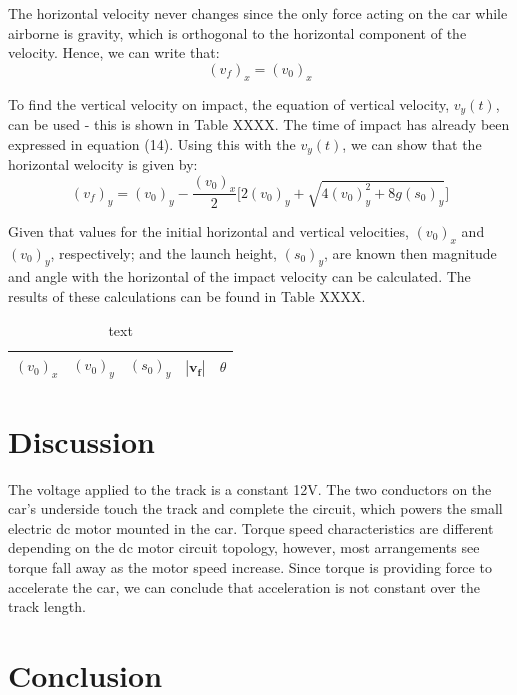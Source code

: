 \documentclass[a4paper]{article}
\begin{document}
The horizontal velocity never changes since the only force acting on the car while airborne is gravity, which is orthogonal to the horizontal component of the velocity. Hence, we can write that:
\begin{equation}
(v_f)_x = (v_0)_x
\end{equation}

To find the vertical velocity on impact, the equation of vertical velocity, $v_y(t)$, can be used - this is shown in Table XXXX. The time of impact has already been expressed in equation (14). Using this with the $v_y(t)$, we can show that the horizontal welocity is given by:
\begin{equation}
(v_f)_y = (v_0)_y - \frac{(v_0)_x}{2} \bigg[2(v_0)_y + \sqrt{4(v_0)_y^2 + 8g(s_0)_y}\bigg]
\end{equation}

Given that values for the initial horizontal and vertical velocities, $(v_0)_x$ and $(v_0)_y$, respectively; and the launch height, $(s_0)_y$, are known then magnitude and angle with the horizontal of the impact velocity can be calculated. The results of these calculations can be found in Table XXXX.

\begin{table}[h]
	\centering
	\caption{text}
	\begin{tabular}{rrrrr}
		\toprule
		$(v_0)_x$ & $(v_0)_y$ & $(s_0)_y$ & $|\boldsymbol{v_f}|$ & $\theta$\\
		\midrule
		\bottomrule
	\end{tabular}
\end{table}

\section{Discussion}
The voltage applied to the track is a constant 12$\si{\volt}$. The two conductors on the car's underside touch the track and complete the circuit, which powers the small electric dc motor mounted in the car. Torque speed characteristics are different depending on the dc motor circuit topology, however, most arrangements see torque fall away as the motor speed increase. Since torque is providing force to accelerate the car, we can conclude that acceleration is not constant over the track length.

\section{Conclusion}



\end{document}
